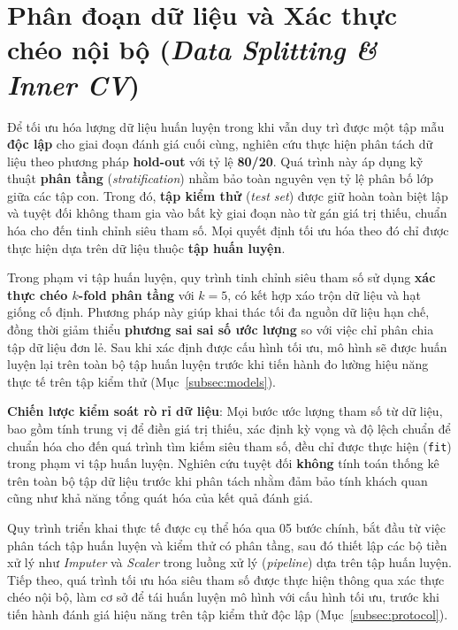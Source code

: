 \documentclass[14pt,a4paper]{extreport}
\begin{document}
\section{Phân đoạn dữ liệu và Xác thực chéo nội bộ (\textit{Data Splitting \& Inner CV})}

Để tối ưu hóa lượng dữ liệu huấn luyện trong khi vẫn duy trì được một tập mẫu \textbf{độc lập} cho giai đoạn đánh giá cuối cùng, nghiên cứu thực hiện phân tách dữ liệu theo phương pháp \textbf{hold-out} với tỷ lệ \textbf{80/20}. Quá trình này áp dụng kỹ thuật \textbf{phân tầng} (\textit{stratification}) nhằm bảo toàn nguyên vẹn tỷ lệ phân bố lớp giữa các tập con. Trong đó, \textbf{tập kiểm thử} (\textit{test set}) được giữ hoàn toàn biệt lập và tuyệt đối không tham gia vào bất kỳ giai đoạn nào từ gán giá trị thiếu, chuẩn hóa cho đến tinh chỉnh siêu tham số. Mọi quyết định tối ưu hóa theo đó chỉ được thực hiện dựa trên dữ liệu thuộc \textbf{tập huấn luyện}.\cite{pedregosa2011}

Trong phạm vi tập huấn luyện, quy trình tinh chỉnh siêu tham số sử dụng \textbf{xác thực chéo $k$-fold phân tầng} với $k=5$, có kết hợp xáo trộn dữ liệu và hạt giống cố định. Phương pháp này giúp khai thác tối đa nguồn dữ liệu hạn chế, đồng thời giảm thiểu \textbf{phương sai sai số ước lượng} so với việc chỉ phân chia tập dữ liệu đơn lẻ. Sau khi xác định được cấu hình tối ưu, mô hình sẽ được huấn luyện lại trên toàn bộ tập huấn luyện trước khi tiến hành đo lường hiệu năng thực tế trên tập kiểm thử (Mục~\ref{subsec:models}).

\textbf{Chiến lược kiểm soát rò rỉ dữ liệu}: Mọi bước ước lượng tham số từ dữ liệu, bao gồm tính trung vị để điền giá trị thiếu, xác định kỳ vọng và độ lệch chuẩn để chuẩn hóa cho đến quá trình tìm kiếm siêu tham số, đều chỉ được thực hiện (\texttt{fit}) trong phạm vi tập huấn luyện. Nghiên cứu tuyệt đối \textbf{không} tính toán thống kê trên toàn bộ tập dữ liệu trước khi phân tách nhằm đảm bảo tính khách quan cũng như khả năng tổng quát hóa của kết quả đánh giá.

Quy trình triển khai thực tế được cụ thể hóa qua 05 bước chính, bắt đầu từ việc phân tách tập huấn luyện và kiểm thử có phân tầng, sau đó thiết lập các bộ tiền xử lý như \textit{Imputer} và \textit{Scaler} trong luồng xử lý (\textit{pipeline}) dựa trên tập huấn luyện. Tiếp theo, quá trình tối ưu hóa siêu tham số được thực hiện thông qua xác thực chéo nội bộ, làm cơ sở để tái huấn luyện mô hình với cấu hình tối ưu, trước khi tiến hành đánh giá hiệu năng trên tập kiểm thử độc lập (Mục~\ref{subsec:protocol}).
\end{document}
